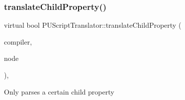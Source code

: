 \mbox{\label{classPUScriptTranslator_a0374d83a8a04e57918975d525e0f8fe8}} 
\subsubsection{\texorpdfstring{translate\+Child\+Property()}{translateChildProperty()}\hspace{0.1cm}{\footnotesize\ttfamily [2/2]}}
{\footnotesize\ttfamily virtual bool P\+U\+Script\+Translator\+::translate\+Child\+Property (\begin{DoxyParamCaption}\item[{\hyperlink{classPUScriptCompiler}{P\+U\+Script\+Compiler} $\ast$}]{compiler,  }\item[{\hyperlink{classPUAbstractNode}{P\+U\+Abstract\+Node} $\ast$}]{node }\end{DoxyParamCaption})\hspace{0.3cm}{\ttfamily [inline]}, {\ttfamily [virtual]}}

Only parses a certain child property 

